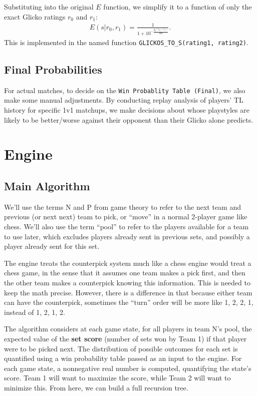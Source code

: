 \documentclass[12pt]{article}
\begin{document}
			Substituting into the original $E$ function, we simplify it to a function of only the exact Glicko ratings $r_0$ and $r_1$:
			\begin{align}
				E(s | r_0, r_1) = \frac{1}{1 + 10^{-\frac{g_0(r_0 - r_1)}{400}}}.
			\end{align}
			This is implemented in the named function \texttt{GLICKOS\_TO\_S(rating1, rating2)}.
	
		\subsection{Final Probabilities}
			For actual matches, to decide on the \texttt{Win Probablity Table (Final)}, we also make some manual adjustments. By conducting replay analysis of players' TL history for specific 1v1 matchups, we make decisions about whose playstyles are likely to be better/worse against their opponent than their Glicko alone predicts.
	\newpage

	\section{Engine}
		\subsection{Main Algorithm}
			We'll use the terms N and P from game theory to refer to the next team and previous (or next next) team to pick, or ``move'' in a normal 2-player game like chess. We'll also use the term ``pool'' to refer to the players available for a team to use later, which excludes players already sent in previous sets, and possibly a player already sent for this set.

			The engine treats the counterpick system much like a chess engine would treat a chess game, in the sense that it assumes one team makes a pick first, and then the other team makes a counterpick knowing this information. This is needed to keep the math precise. However, there is a difference in that because either team can have the counterpick, sometimes the ``turn'' order will be more like 1, 2, 2, 1, instead of 1, 2, 1, 2.

			The algorithm considers at each game state, for all players in team N's pool, the expected value of the \textbf{set score} (number of sets won by Team 1) if that player were to be picked next. The distribution of possible outcomes for each set is quantified using a win probability table passed as an input to the engine. For each game state, a nonnegative real number is computed, quantifying the state's score. Team 1 will want to maximize the score, while Team 2 will want to minimize this. From here, we can build a full recursion tree.
\end{document}
